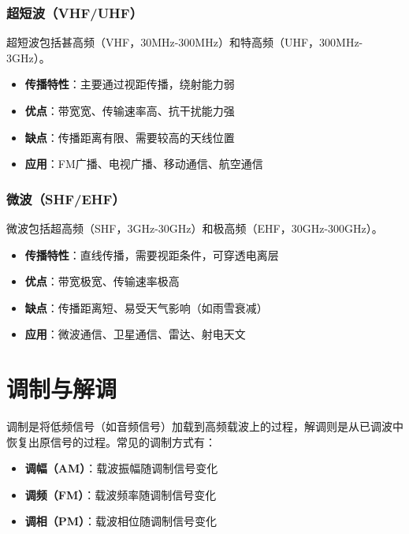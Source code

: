 \subsubsection{超短波（VHF/UHF）}
\label{sec:ultra_short_wave}

超短波包括甚高频（VHF，30MHz-300MHz）和特高频（UHF，300MHz-3GHz）。

\begin{itemize}
    \item \textbf{传播特性}：主要通过视距传播，绕射能力弱
    \item \textbf{优点}：带宽宽、传输速率高、抗干扰能力强
    \item \textbf{缺点}：传播距离有限、需要较高的天线位置
    \item \textbf{应用}：FM广播、电视广播、移动通信、航空通信
\end{itemize}

\subsubsection{微波（SHF/EHF）}
\label{sec:microwave}

微波包括超高频（SHF，3GHz-30GHz）和极高频（EHF，30GHz-300GHz）。

\begin{itemize}
    \item \textbf{传播特性}：直线传播，需要视距条件，可穿透电离层
    \item \textbf{优点}：带宽极宽、传输速率极高
    \item \textbf{缺点}：传播距离短、易受天气影响（如雨雪衰减）
    \item \textbf{应用}：微波通信、卫星通信、雷达、射电天文
\end{itemize}

\section{调制与解调}
\label{sec:modulation_demodulation}

调制是将低频信号（如音频信号）加载到高频载波上的过程，解调则是从已调波中恢复出原信号的过程。常见的调制方式有：

\begin{itemize}
    \item \textbf{调幅（AM）}：载波振幅随调制信号变化
    \item \textbf{调频（FM）}：载波频率随调制信号变化
    \item \textbf{调相（PM）}：载波相位随调制信号变化
\end{itemize}

